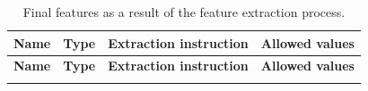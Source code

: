 \documentclass{article}
\begin{document}
\begin{longtable}{
  >{\RaggedRight\arraybackslash}p{}
  >{\RaggedRight\arraybackslash}p{}
  >{\RaggedRight\arraybackslash}p{}
  >{\RaggedRight\arraybackslash}p{}
}
\caption{Final features as a result of the feature extraction process.}\label{tab:pmr_features}\\
\toprule
\textbf{Name} & \textbf{Type} & \textbf{Extraction instruction} & \textbf{Allowed values} \\
\midrule
\endfirsthead

\toprule
\textbf{Name} & \textbf{Type} & \textbf{Extraction instruction} & \textbf{Allowed values} \\
\midrule
\endhead

\bottomrule
\endfoot


\end{longtable}
\end{document}

